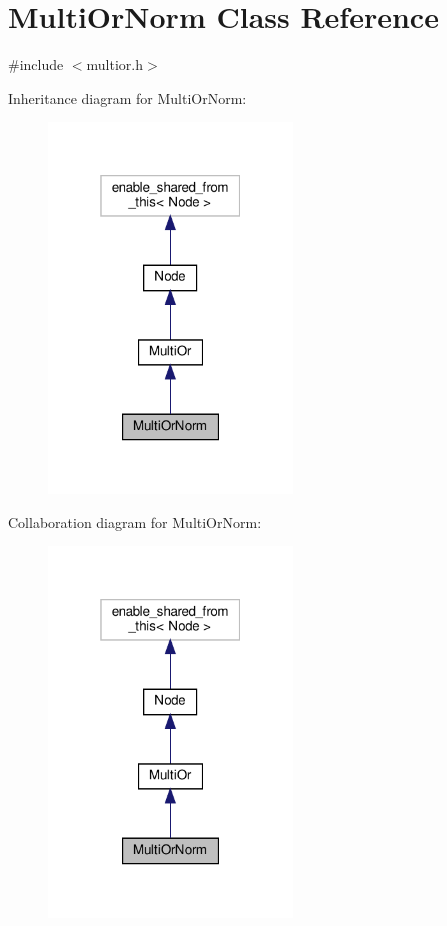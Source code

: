 \hypertarget{class_multi_or_norm}{}\section{Multi\+Or\+Norm Class Reference}
\label{class_multi_or_norm}


{\ttfamily \#include $<$multior.\+h$>$}



Inheritance diagram for Multi\+Or\+Norm\+:\nopagebreak
\begin{figure}[H]
\begin{center}
\leavevmode
\includegraphics[width=184pt]{d2/d69/class_multi_or_norm__inherit__graph}
\end{center}
\end{figure}


Collaboration diagram for Multi\+Or\+Norm\+:\nopagebreak
\begin{figure}[H]
\begin{center}
\leavevmode
\includegraphics[width=184pt]{d9/d73/class_multi_or_norm__coll__graph}
\end{center}
\end{figure}
